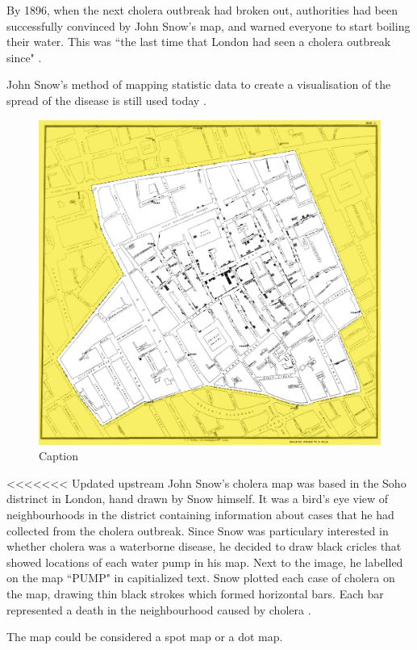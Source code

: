\documentclass[12pt]{article}
\begin{document}
By 1896, when the next cholera outbreak had broken out, authorities had been successfully convinced by John Snow's map, and warned everyone to start boiling their water. This was ``the last time that London had seen a cholera outbreak since" \cite{tedtalk}.

John Snow's method of mapping statistic data to create a visualisation of the spread of the disease is still used today \cite{channel1}. 

\begin{figure}
\centering
\includegraphics{snowmap_1854}
\caption{Caption}
\label{fig:snow}
\end{figure}

<<<<<<< Updated upstream
John Snow's cholera map was based in the Soho distrinct in London, hand drawn by Snow himself. It was a bird's eye view of neighbourhoods in the district containing information about cases that he had collected from the cholera outbreak. Since Snow was particulary interested in whether cholera was a waterborne disease, he decided to draw black cricles that showed locations of each water pump in his map. Next to the image, he labelled on the map ``PUMP" in capitialized text. Snow plotted each case of cholera on the map, drawing thin black strokes which formed horizontal bars. Each bar represented a death in the neighbourhood caused by cholera \cite{tedtalk}.


The map could be considered a spot map or a dot map. 
\end{document}
